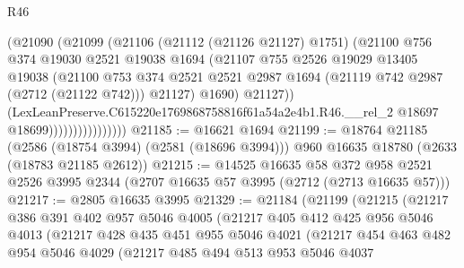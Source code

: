 \begin{lexlean}{R46}
\begin{coremodule}
                              (@21090
                                (@21099
                                  (@21106
                                    (@21112 (@21126 @21127) @1751)
                                    (@21100
                                      @756
                                      @374
                                      @19030
                                      @2521
                                      @19038
                                      @1694
                                      (@21107
                                        @755
                                        @2526
                                        @19029
                                        @13405
                                        @19038
                                        (@21100
                                          @753
                                          @374
                                          @2521
                                          @2521
                                          @2987
                                          @1694
                                          (@21119 @742 @2987 (@2712 (@21122 @742)))
                                          @21127)
                                        @1690)
                                      @21127))
                                  (LexLeanPreserve.C615220e1769868758816f61a54a2e4b1.R46.__rel_2
                                    @18697
                                    @18699))))))))))))))))
@21185 := @16621 @1694
@21199 := @18764
    @21185
    (@2586 (@18754 @3994) (@2581 (@18696 @3994)))
    @960
    @16635
    @18780
    (@2633 (@18783 @21185 @2612))
@21215 := @14525
    @16635
    @58
    @372
    @958
    @2521
    @2526
    @3995
    @2344
    (@2707 @16635 @57 @3995 (@2712 (@2713 @16635 @57)))
@21217 := @2805 @16635 @3995
@21329 := @21184
    (@21199
      (@21215
        (@21217
          @386
          @391
          @402
          @957
          @5046
          @4005
          (@21217
            @405
            @412
            @425
            @956
            @5046
            @4013
            (@21217
              @428
              @435
              @451
              @955
              @5046
              @4021
              (@21217
                @454
                @463
                @482
                @954
                @5046
                @4029
                (@21217
                  @485
                  @494
                  @513
                  @953
                  @5046
                  @4037

\end{coremodule}
\end{lexlean}
